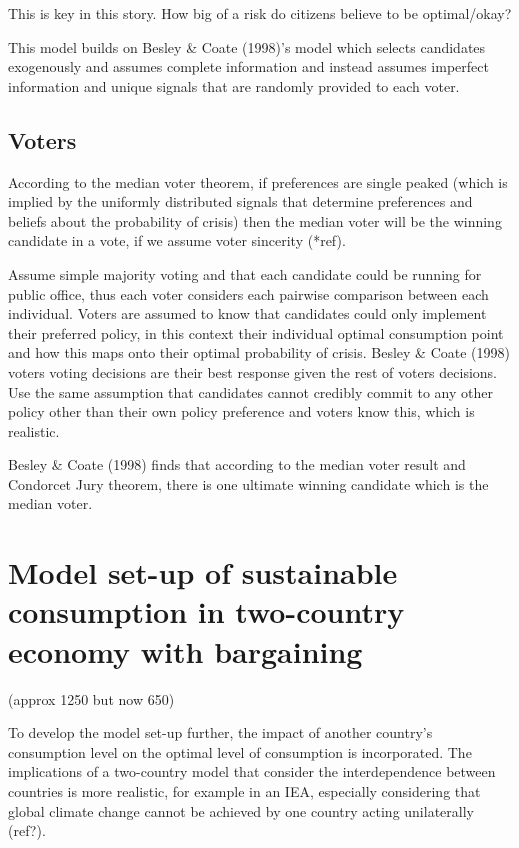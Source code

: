 \documentclass[11pt,preprint, authoryear]{elsarticle}
\numberwithin{equation}{section}
\numberwithin{figure}{section}
\numberwithin{table}{section}
\begin{document}
This is key in this story. How big of a risk do citizens believe to be
optimal/okay?

This model builds on Besley \& Coate (1998)'s model which selects
candidates exogenously and assumes complete information and instead
assumes imperfect information and unique signals that are randomly
provided to each voter.

\hypertarget{voters}{%
\subsection*{Voters}\label{voters}}

According to the median voter theorem, if preferences are single peaked
(which is implied by the uniformly distributed signals that determine
preferences and beliefs about the probability of crisis) then the median
voter will be the winning candidate in a vote, if we assume voter
sincerity (*ref).

Assume simple majority voting and that each candidate could be running
for public office, thus each voter considers each pairwise comparison
between each individual. Voters are assumed to know that candidates
could only implement their preferred policy, in this context their
individual optimal consumption point and how this maps onto their
optimal probability of crisis. Besley \& Coate (1998) voters voting
decisions are their best response given the rest of voters decisions.
Use the same assumption that candidates cannot credibly commit to any
other policy other than their own policy preference and voters know
this, which is realistic.

Besley \& Coate (1998) finds that according to the median voter result
and Condorcet Jury theorem, there is one ultimate winning candidate
which is the median voter.

\hypertarget{model-set-up-of-sustainable-consumption-in-two-country-economy-with-bargaining}{%
\section{Model set-up of sustainable consumption in two-country economy
with
bargaining}\label{model-set-up-of-sustainable-consumption-in-two-country-economy-with-bargaining}}

(approx 1250 but now 650)

To develop the model set-up further, the impact of another country's
consumption level on the optimal level of consumption is incorporated.
The implications of a two-country model that consider the
interdependence between countries is more realistic, for example in an
IEA, especially considering that global climate change cannot be
achieved by one country acting unilaterally (ref?).
\end{document}

